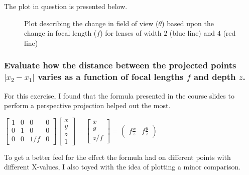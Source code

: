 \documentclass[a4paper, titlepage,12pt]{article}
\begin{document}
The plot in question is presented below.
 
\begin{figure}[H]
\begin{center}
\end{center}
	\caption{Plot describing the change in field of view ($\theta$) based upon the change in focal length ($f$) for lenses of width $2$ (blue line) and $4$ (red line)}
\end{figure}

\subsubsection*{Evaluate how the distance between the projected points $|x_2 - x_1|$ varies as a function of focal lengths $f$ and depth $z$.}

	For this exercise, I found that the formula presented in the course slides to perform a perspective projection helped out the most.

	\begin{center}
		$\begin{bmatrix}
			1 & 0 & 0 & 0\\
			0 & 1 & 0 & 0\\
			0 & 0 & 1/f & 0
		\end{bmatrix}
		\begin{bmatrix}
			x \\
			y \\
			z \\
			1
		\end{bmatrix}
		= \begin{bmatrix}
			x \\
			y \\
			z/f
		\end{bmatrix}
		= \begin{pmatrix}
			f \frac{x}{z} & f \frac{y}{z}
		\end{pmatrix}
		$
	\end{center}

	To get a better feel for the effect the formula had on different points with different X-values, I also toyed with the idea of plotting a minor comparison.
\end{document}
